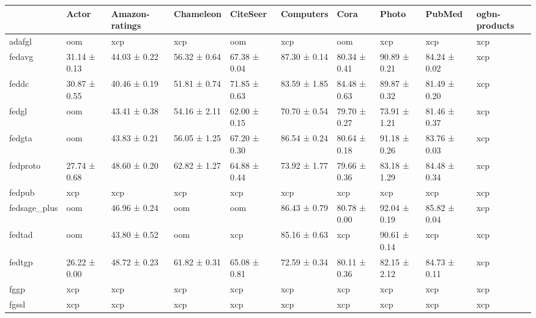 \begin{tabular}{llllllllll}
\toprule
 & Actor & Amazon-ratings & Chameleon & CiteSeer & Computers & Cora & Photo & PubMed & ogbn-products \\
\midrule
adafgl & oom & xcp & xcp & oom & xcp & oom & xcp & xcp & xcp \\
fedavg & 31.14 ± 0.13 & 44.03 ± 0.22 & 56.32 ± 0.64 & 67.38 ± 0.04 & 87.30 ± 0.14 & 80.34 ± 0.41 & 90.89 ± 0.21 & 84.24 ± 0.02 & xcp \\
feddc & 30.87 ± 0.55 & 40.46 ± 0.19 & 51.81 ± 0.74 & 71.85 ± 0.63 & 83.59 ± 1.85 & 84.48 ± 0.63 & 89.87 ± 0.32 & 81.49 ± 0.20 & xcp \\
fedgl & oom & 43.41 ± 0.38 & 54.16 ± 2.11 & 62.00 ± 0.15 & 70.70 ± 0.54 & 79.70 ± 0.27 & 73.91 ± 1.21 & 81.46 ± 0.37 & xcp \\
fedgta & oom & 43.83 ± 0.21 & 56.05 ± 1.25 & 67.20 ± 0.30 & 86.54 ± 0.24 & 80.64 ± 0.18 & 91.18 ± 0.26 & 83.76 ± 0.03 & xcp \\
fedproto & 27.74 ± 0.68 & 48.60 ± 0.20 & 62.82 ± 1.27 & 64.88 ± 0.44 & 73.92 ± 1.77 & 79.66 ± 0.36 & 83.18 ± 1.29 & 84.48 ± 0.34 & xcp \\
fedpub & xcp & xcp & xcp & xcp & xcp & xcp & xcp & xcp & xcp \\
fedsage_plus & oom & 46.96 ± 0.24 & oom & oom & 86.43 ± 0.79 & 80.78 ± 0.00 & 92.04 ± 0.19 & 85.82 ± 0.04 & xcp \\
fedtad & oom & 43.80 ± 0.52 & oom & xcp & 85.16 ± 0.63 & xcp & 90.61 ± 0.14 & xcp & xcp \\
fedtgp & 26.22 ± 0.00 & 48.72 ± 0.23 & 61.82 ± 0.31 & 65.08 ± 0.81 & 72.59 ± 0.34 & 80.11 ± 0.36 & 82.15 ± 2.12 & 84.73 ± 0.11 & xcp \\
fggp & xcp & xcp & xcp & xcp & xcp & xcp & xcp & xcp & xcp \\
fgssl & xcp & xcp & xcp & xcp & xcp & xcp & xcp & xcp & xcp \\
\bottomrule
\end{tabular}
